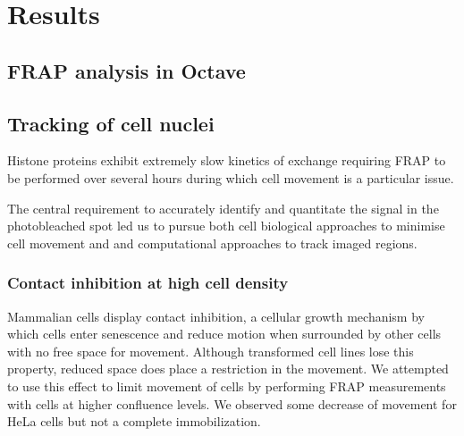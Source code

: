 \section{Results}

  \subsection{FRAP analysis in Octave}

  \subsection{Tracking of cell nuclei}


    Histone proteins exhibit extremely slow kinetics of exchange
    requiring FRAP to be performed over several hours during which cell movement is
    a particular issue. %


    The central requirement to accurately identify and quantitate the signal
    in the photobleached spot led us to pursue both cell biological approaches to
    minimise cell movement and and computational approaches to track imaged regions.

    \subsubsection{Contact inhibition at high cell density}

      Mammalian cells display contact inhibition,
      a cellular growth mechanism by which cells enter senescence and reduce motion
      when surrounded by other cells with no free space for movement.
      Although transformed cell lines lose this property,
      reduced space does place a restriction in the movement.
      We attempted to use this effect to limit movement of cells
      by performing FRAP measurements with cells at higher confluence levels.
      We observed some decrease of movement for HeLa cells but not a complete immobilization.

